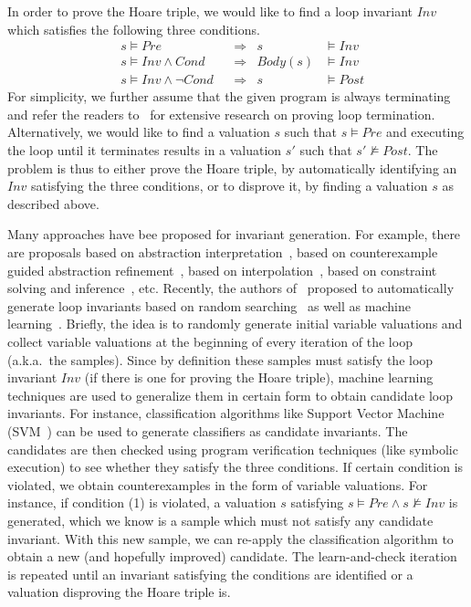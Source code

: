 In order to prove the Hoare triple, we would like to find a loop invariant $Inv$ which satisfies the following three conditions.
\begin{align}
    &s \models Pre
        &&\Longrightarrow & s &\models Inv \label{inv:pre} \\
    &s \models Inv \wedge Cond
        &&\Longrightarrow & Body(s) &\models Inv \label{inv:loop} \\
    &s \models Inv \wedge \neg Cond
        &&\Longrightarrow & s &\models Post \label{inv:post}
\end{align}
For simplicity, we further assume that the given program is always terminating and refer the readers to~\cite{} for extensive research on proving loop termination.
Alternatively, we would like to find a valuation $s$ such that $s \models \mathit{Pre}$ and executing the loop until it terminates results in a valuation $s'$ such that $s' \not \models Post$.
The problem is thus to either prove the Hoare triple, by automatically identifying an $Inv$ satisfying the three conditions, or to disprove it, by finding a valuation $s$ as described above.

Many approaches have bee proposed for invariant generation. For example, there are proposals based on abstraction interpretation~\cite{cite}, based on counterexample guided abstraction refinement~\cite{cite}, based on interpolation~\cite{cite}, based on constraint solving and inference~\cite{cite}, etc. Recently, the authors of~\cite{sharma2012interpolants,DBLP:conf/sas/0001GHAN13,sharma2014invariant} proposed to automatically generate loop invariants based on random searching~\cite{sharma2014invariant} as well as machine learning~\cite{sharma2012interpolants}. Briefly, the idea is to randomly generate initial variable valuations and collect variable valuations at the beginning of every iteration of the loop (a.k.a.~the samples). Since by definition these samples must satisfy the loop invariant $Inv$ (if there is one for proving the Hoare triple), machine learning techniques are used to generalize them in certain form to obtain candidate loop invariants. For instance, classification algorithms like Support Vector Machine (SVM~\cite{sharma2012interpolants,DBLP:conf/sas/0001GHAN13}) can be used to generate classifiers as candidate invariants. The candidates are then checked using program verification techniques (like symbolic execution) to see whether they satisfy the three conditions. If certain condition is violated, we obtain counterexamples in the form of variable valuations. For instance, if condition (1) is violated, a valuation $s$ satisfying $s \models Pre \land s \not \models Inv$ is generated, which we know is a sample which must not satisfy any candidate invariant. With this new sample, we can re-apply the classification algorithm to obtain a new (and hopefully improved) candidate. The learn-and-check iteration is repeated until an invariant satisfying the conditions are identified or a valuation disproving the Hoare triple is.

